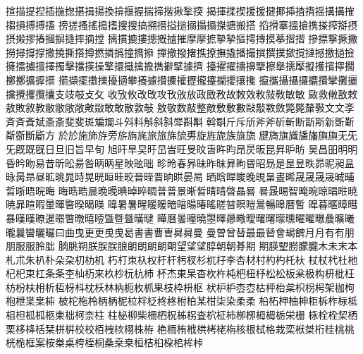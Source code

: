揎󠄀描󠄀提󠄀揑󠄀插󠄀揓󠄀揔󠄀揕󠄀揖󠄀揚󠄀換󠄀揜󠄀揠󠄀握󠄀揣󠄀揥󠄀揩󠄀揪󠄀揫󠄀揬󠄀
揭󠄀揮󠄀揲󠄀揳󠄀援󠄀援󠄁揵󠄀揶󠄀揷󠄀揸󠄀揹󠄀揺󠄀搆󠄀搆󠄁搉󠄀搊󠄀損󠄀搏󠄀搏󠄁搐󠄀
搒󠄀搓󠄀搔󠄀搖󠄀搗󠄀搘󠄀搜󠄀搜󠄁搞󠄀搠󠄀搢󠄀搤󠄀搥󠄀搦󠄀搨󠄀搨󠄁搩󠄀搪󠄀搬󠄀搭󠄀
搯󠄀搰󠄀搴󠄀搵󠄀搶󠄀携󠄀搽󠄀搾󠄀搿󠄀摂󠄀摂󠄁摋󠄀摎󠄀摏󠄀摑󠄀摒󠄀摓󠄀摔󠄀摘󠄀摚󠄀
摛󠄀摜󠄀摝󠄀摟󠄀摠󠄀摡󠄀摣󠄀摧󠄀摩󠄀摩󠄁摭󠄀摯󠄀摯󠄁摳󠄀摴󠄀摶󠄀摸󠄀摹󠄀摺󠄀摺󠄁
摻󠄀摽󠄀撃󠄀撅󠄀撇󠄀撈󠄀撏󠄀撐󠄀撑󠄀撒󠄀撓󠄀撕󠄀撘󠄀撙󠄀撚󠄀撛󠄀撝󠄀撞󠄀撟󠄀撡󠄀
撣󠄀撤󠄀撥󠄀撦󠄀撨󠄀撩󠄀撫󠄀撬󠄀播󠄀撮󠄀撰󠄀撰󠄁撲󠄀撳󠄀撹󠄀撻󠄀撼󠄀撽󠄀撾󠄀撿󠄀
擁󠄀擂󠄀擄󠄀擅󠄀擇󠄀擉󠄀擊󠄀擋󠄀擌󠄀操󠄀擎󠄀擐󠄀擑󠄀擒󠄀擔󠄀擕󠄀擗󠄀擘󠄀據󠄀擠󠄀
擡󠄀擢󠄀擢󠄁擣󠄀擤󠄀擥󠄀擦󠄀擧󠄀擩󠄀擪󠄀擬󠄀擭󠄀擯󠄀擰󠄀擱󠄀擲󠄀擲󠄁擴󠄀擵󠄀擶󠄀
擶󠄁擷󠄀擺󠄀擻󠄀擽󠄀擾󠄀擿󠄀攀󠄀攁󠄀攄󠄀攅󠄀攈󠄀攉󠄀攊󠄀攏󠄀攓󠄀攔󠄀攖󠄀攘󠄀攙󠄀
攛󠄀攜󠄀攝󠄀攝󠄁攞󠄀攟󠄀攢󠄀攣󠄀攤󠄀攦󠄀攩󠄀攪󠄀攫󠄀攬󠄀攮󠄀支󠄀攱󠄀攲󠄀攴󠄀攵󠄀
收󠄀攷󠄀攸󠄀改󠄀攺󠄀攻󠄀攼󠄀攽󠄀放󠄀政󠄀敃󠄀敄󠄀故󠄀敇󠄀效󠄀敉󠄀敍󠄀敎󠄀敏󠄀敏󠄁
敐󠄀救󠄀敒󠄀敔󠄀敕󠄀敖󠄀敗󠄀敘󠄀教󠄀敝󠄀敝󠄁敞󠄀敞󠄁敟󠄀敠󠄀敢󠄀敢󠄁散󠄀敦󠄀敧󠄀
敫󠄀敬󠄀数󠄀敲󠄀整󠄀敵󠄀敷󠄀敷󠄁數󠄀敺󠄀敽󠄀斁󠄀斂󠄀斃󠄀斃󠄁斄󠄀斅󠄀文󠄀文󠄁斈󠄀
斉󠄀斉󠄁斊󠄀斌󠄀斎󠄀斎󠄁斐󠄀斐󠄁斑󠄀斒󠄀斕󠄀斗󠄀斘󠄀料󠄀斛󠄀斜󠄀斜󠄁斝󠄀斟󠄀斠󠄀
斡󠄀斣󠄀斤󠄀斥󠄀斦󠄀斧󠄀斧󠄁斫󠄀斬󠄀断󠄀斮󠄀斯󠄀新󠄀斲󠄀斳󠄀斴󠄀斵󠄀斷󠄀斸󠄀方󠄀
於󠄀於󠄁施󠄀斾󠄀斿󠄀旁󠄀旂󠄀旃󠄀旄󠄀旅󠄀旅󠄁旆󠄀旈󠄀旉󠄀旋󠄀旌󠄀旎󠄀族󠄀旐󠄀旒󠄀
旔󠄀旖󠄀旗󠄀旘󠄀旙󠄀旛󠄀旟󠄀旟󠄁无󠄀旡󠄀旡󠄁既󠄀既󠄁旣󠄀日󠄀旦󠄀旧󠄀旨󠄀早󠄀旬󠄀
旭󠄀旰󠄀旱󠄀旲󠄀旴󠄀旵󠄀旹󠄀旺󠄀旻󠄀旼󠄀旾󠄀旿󠄀昀󠄀昂󠄀昃󠄀昄󠄀昆󠄀昇󠄀昈󠄀昉󠄀
昊󠄀昌󠄀昍󠄀明󠄀明󠄁昏󠄀昑󠄀昒󠄀易󠄀昔󠄀昕󠄀昖󠄀昜󠄀昝󠄀昞󠄀昞󠄁星󠄀映󠄀昡󠄀昢󠄀
昣󠄀昤󠄀春󠄀昦󠄀昧󠄀昨󠄀昩󠄀昪󠄀昫󠄀昬󠄀昭󠄀昮󠄀是󠄀昰󠄀昱󠄀昳󠄀昴󠄀昵󠄀昶󠄀昷󠄀
昹󠄀昺󠄀昻󠄀昼󠄀昿󠄀晀󠄀晁󠄀時󠄀晃󠄀晄󠄀晅󠄀晆󠄀晈󠄀晉󠄀晊󠄀晋󠄀晌󠄀晎󠄀晏󠄀晑󠄀
晒󠄀晗󠄀晘󠄀晙󠄀晚󠄀晛󠄀晜󠄀晝󠄀晞󠄀晟󠄀晟󠄁晟󠄂晟󠄃晠󠄀晡󠄀晢󠄀晣󠄀晤󠄀晥󠄀晦󠄀
晦󠄁晧󠄀晧󠄁晨󠄀晩󠄀晩󠄁晪󠄀晫󠄀晬󠄀晭󠄀普󠄀普󠄁景󠄀晰󠄀晳󠄀晴󠄀晴󠄁晵󠄀晶󠄀晷󠄀
晷󠄁晸󠄀晹󠄀智󠄀晻󠄀晼󠄀晾󠄀晿󠄀暀󠄀暁󠄀暁󠄁暃󠄀暄󠄀暇󠄀暈󠄀暉󠄀暋󠄀暌󠄀暍󠄀暎󠄀
暐󠄀暑󠄀暑󠄁暒󠄀暖󠄀暖󠄁暗󠄀暗󠄁暘󠄀暙󠄀暚󠄀暛󠄀暜󠄀暝󠄀暟󠄀暠󠄀暢󠄀暤󠄀暦󠄀暫󠄀
暭󠄀暮󠄀暱󠄀暲󠄀暳󠄀暴󠄀暵󠄀暵󠄁暸󠄀暹󠄀暻󠄀暼󠄀暾󠄀暿󠄀曀󠄀曁󠄀曁󠄁曁󠄂曂󠄀曃󠄀
曄󠄀曆󠄀曇󠄀曈󠄀曉󠄀曌󠄀曎󠄀曏󠄀曔󠄀曖󠄀曙󠄀曙󠄁曚󠄀曛󠄀曜󠄀曜󠄁曝󠄀曟󠄀曠󠄀曦󠄀
曨󠄀曩󠄀曫󠄀曬󠄀曮󠄀曰󠄀曲󠄀曳󠄀更󠄀更󠄁曵󠄀曵󠄁曷󠄀書󠄀書󠄁曹󠄀曺󠄀曻󠄀曻󠄁曼󠄀
曼󠄁曽󠄀曾󠄀替󠄀最󠄀最󠄁朁󠄀會󠄀朅󠄀朇󠄀月󠄀月󠄁有󠄀有󠄁朋󠄀朋󠄁服󠄀服󠄁朎󠄀朏󠄀
朒󠄀朓󠄀朔󠄀朕󠄀朕󠄁朕󠄂朖󠄀朗󠄀朗󠄁朗󠄂朗󠄃朙󠄀望󠄀望󠄁望󠄂朜󠄀朝󠄀朝󠄁朞󠄀期󠄀
期󠄁朠󠄀朢󠄀朥󠄀朦󠄀朧󠄀木󠄀未󠄀末󠄀本󠄀札󠄀朮󠄀朱󠄀朳󠄀朴󠄀朵󠄀朶󠄀朷󠄀朸󠄀机󠄀
朽󠄀朾󠄀朿󠄀杁󠄀权󠄀杅󠄀杆󠄀杇󠄀杈󠄀杉󠄀杌󠄀杍󠄀李󠄀杏󠄀材󠄀村󠄀杓󠄀杓󠄁杔󠄀杕󠄀
杖󠄀杖󠄁杙󠄀杜󠄀杝󠄀杞󠄀杞󠄁束󠄀杠󠄀条󠄀条󠄁杢󠄀杣󠄀杤󠄀来󠄀杦󠄀杪󠄀杬󠄀杭󠄀杮󠄀
杯󠄀杰󠄀東󠄀杲󠄀杳󠄀杴󠄀杵󠄀杶󠄀杷󠄀杻󠄀杼󠄀松󠄀松󠄁板󠄀枀󠄀极󠄀构󠄀枅󠄀枇󠄀枉󠄀
枋󠄀枌󠄀枎󠄀枏󠄀析󠄀枑󠄀枒󠄀枓󠄀枕󠄀枖󠄀林󠄀枘󠄀枙󠄀枚󠄀枛󠄀果󠄀枝󠄀枠󠄀枡󠄀枢󠄀
枤󠄀枦󠄀枦󠄁枩󠄀枩󠄁枯󠄀枰󠄀枱󠄀枲󠄀枳󠄀枴󠄀枵󠄀架󠄀枷󠄀枸󠄀枹󠄀枻󠄀枼󠄀枽󠄀枾󠄀
柀󠄀柁󠄀柂󠄀柃󠄀柄󠄀柄󠄁柅󠄀柆󠄀柈󠄀柉󠄀柊󠄀柊󠄁柎󠄀柏󠄀某󠄀柑󠄀柒󠄀染󠄀柔󠄀柔󠄁
柗󠄀柘󠄀柙󠄀柚󠄀柛󠄀柜󠄀柝󠄀柞󠄀柡󠄀柢󠄀柤󠄀柦󠄀柧󠄀柧󠄁柩󠄀柬󠄀柮󠄀柯󠄀柰󠄀柱󠄀
柱󠄁柲󠄀柳󠄀柴󠄀柵󠄀柶󠄀柷󠄀柹󠄀柺󠄀査󠄀柼󠄀柾󠄀柿󠄀栁󠄀栁󠄁栂󠄀栂󠄁栃󠄀栄󠄀栅󠄀
栐󠄀栓󠄀栓󠄁栔󠄀栖󠄀栗󠄀栘󠄀栙󠄀栝󠄀栞󠄀栟󠄀栟󠄁校󠄀校󠄁栢󠄀栧󠄀栨󠄀栩󠄀株󠄀栫󠄀
栬󠄀栭󠄀栯󠄀栰󠄀栱󠄀栲󠄀栳󠄀栴󠄀核󠄀根󠄀栻󠄀格󠄀栽󠄀栾󠄀栿󠄀桀󠄀桁󠄀桂󠄀桃󠄀桃󠄁
桄󠄀桅󠄀框󠄀案󠄀桉󠄀桊󠄀桌󠄀桍󠄀桎󠄀桐󠄀桑󠄀桒󠄀桒󠄁桓󠄀桔󠄀桕󠄀桗󠄀桘󠄀桙󠄀桛󠄀
